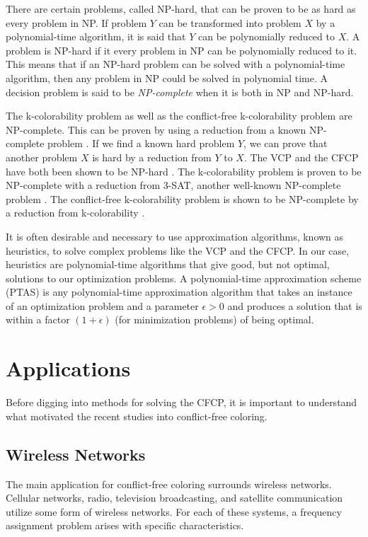 \documentclass{sig-alternate}
\begin{document}
There are certain problems, called NP-hard, that can be proven to be as hard as every problem in NP. If problem $Y$ can be transformed into problem $X$ by a polynomial-time algorithm, it is said that $Y$ can be polynomially reduced to $X$. A problem is NP-hard if it every problem in NP can be polynomially reduced to it. This means that if an NP-hard problem can be solved with a polynomial-time algorithm, then any problem in NP could be solved in polynomial time. A decision problem is said to be \emph{NP-complete} when it is both in NP and NP-hard.

The k-colorability problem as well as the conflict-free k-colorability problem are NP-complete. This can be proven by using a reduction from a known NP-complete problem \cite{garey2002computers}. If we find a known hard problem $Y$, we can prove that another problem $X$ is hard by a reduction from $Y$ to $X$. The VCP and the CFCP have both been shown to be NP-hard \cite{abel2017three,moret1998theory}. The k-colorability problem is proven to be NP-complete with a reduction from 3-SAT, another well-known NP-complete problem \cite{sharma2012new}. The conflict-free k-colorability problem is shown to be NP-complete by a reduction from k-colorability \cite{abel2017three}.

It is often desirable and necessary to use approximation algorithms, known as heuristics, to solve complex problems like the VCP and the CFCP. In our case, heuristics are polynomial-time algorithms that give good, but not optimal, solutions to our optimization problems. A polynomial-time approximation scheme (PTAS) is any polynomial-time approximation algorithm that takes an instance of an optimization problem and a parameter $\epsilon > 0$ and produces a solution that is within a factor $(1 + \epsilon)$ (for minimization problems) of being optimal.

\vspace{-0.2cm}

\section{Applications}
Before digging into methods for solving the CFCP, it is important to understand what motivated the recent studies into conflict-free coloring.

\subsection{Wireless Networks}
The main application for conflict-free coloring surrounds wireless networks. Cellular networks, radio, television broadcasting, and satellite communication utilize some form of wireless networks. For each of these systems, a frequency assignment problem arises with specific characteristics.
\end{document}
